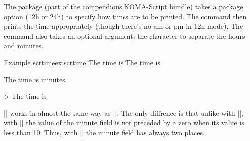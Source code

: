 The  package (part of the compendious KOMA-Script bundle) takes a package option (12h or 24h) to specify how times are to be printed. The command \cmd{\thistime} then prints the time appropriately (though there's no am or pm in 12h mode). The \cmd{\thistime} command also takes an optional argument, the character to separate the hours and minutes.


\begin{texexample}{Example scrtime}{ex:scrtime}
The time is \thistime
The time is \thistime[h]
\end{texexample}

\label{datesend}


The time is \thistime[ hours ] minutes 

{> The time is \thistime*[:] } 

|\thistime*| works in almost the same way as |\thistime|. The only
diffrence is that unlike with |\thistime|, with |\thistime*| the value of
the minute field is not preceded by a zero when its value is less than 10.
Thus, with |\thistime| the minute field has always two places.



\begin{comment}



\pdfcreationdate
\newcounter{temp}
\setcounter{temp}{1}
\let\Box=\boxed

\def\Box#1{\fbox{\strut\textbf{#1}$\scriptscriptstyle\,_{\thetemp}$\stepcounter{temp} }}

\Box{D}\Box{:} \Box{\color{red}2}\Box{\color{red}0}\Box{\color{red}1}%
\Box{\color{red}1}
 \Box{0}\Box{1}
\Box{\color{purple}1} \Box{\color{purple}1}\Box{0}

\newtoks\tyear
\newtoks\tmonth
\newtoks\tday
\newtoks\thour
\newtoks\tminutes
\newtoks\tseconds
\newtoks\UTCh

\def\grabtimezone #1#2#3#4#5#6#7#8{
\tyear={#3#4#5#6}%
\tmonth{#7#8}%
\grabtimezoneB}

\def\grabtimezoneB #1#2#3#4#5#6#7#8{
  \tday={#1#2}%
  \thour={#3#4}%
  \tminutes={#5#6}%
  \tseconds={#7#8}%
\grabtimezoneC}

%
%
%
%
%
%
%
%
%
\end{comment}


